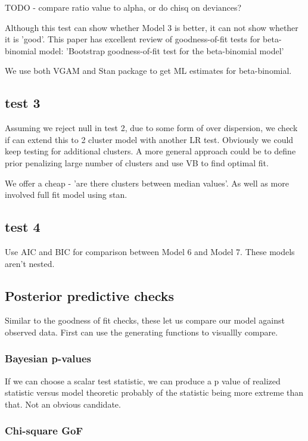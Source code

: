 \documentclass[12pt]{article}
\begin{document}
TODO - compare ratio value to alpha, or do chisq on deviances?

Although this test can show whether Model 3 is better, it can not show whether it is 'good'. This paper has excellent review of goodness-of-fit tests for beta-binomial model:
'Bootstrap goodness-of-fit test for the beta-binomial model'

We use both VGAM and Stan package to get ML estimates for beta-binomial.

\subsection{test 3}

Assuming we reject null in test 2, due to some form of over dispersion, we check if can extend this to 2 cluster model with another LR test. Obviously we could keep testing for additional clusters. A more general approach could be to define prior penalizing large number of clusters and use VB to find optimal fit.

We offer a cheap - 'are there clusters between median values'. As well as more involved full fit model using stan.

\subsection{test 4}

Use AIC and BIC for comparison between Model 6 and Model 7. These models aren't nested.

\subsection{Posterior predictive checks}

Similar to the goodness of fit checks, these let us compare our model against observed data. First can use the generating functions to visuallly compare.

\subsubsection{Bayesian p-values}

If we can choose a scalar test statistic, we can produce a p value of realized statistic versus model theoretic probably of the statistic being more extreme than that. Not an obvious candidate.

\subsubsection{Chi-square GoF}
\end{document}
